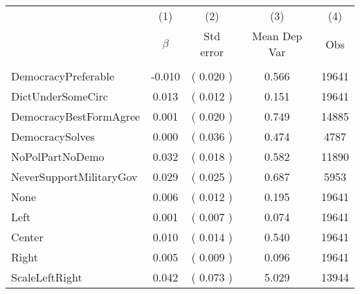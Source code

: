 \begin{tabular}{l c c c c} \toprule\toprule
& (1) & (2) & (3) & (4) \\
& $\beta$ & Std error & Mean Dep Var & Obs \\ \cmidrule(lr){2-2}\cmidrule(lr){3-3}\cmidrule(lr){4-4}\cmidrule(lr){5-5}&\\
DemocracyPreferable &    -0.010 & (    0.020 ) &     0.566 &     19641  \\
DictUnderSomeCirc &     0.013 & (    0.012 ) &     0.151 &     19641  \\
DemocracyBestFormAgree &     0.001 & (    0.020 ) &     0.749 &     14885  \\
DemocracySolves &     0.000 & (    0.036 ) &     0.474 &      4787  \\
NoPolPartNoDemo &     0.032 & (    0.018 ) &     0.582 &     11890  \\
NeverSupportMilitaryGov &     0.029 & (    0.025 ) &     0.687 &      5953  \\
None &     0.006 & (    0.012 ) &     0.195 &     19641  \\
Left &     0.001 & (    0.007 ) &     0.074 &     19641  \\
Center &     0.010 & (    0.014 ) &     0.540 &     19641  \\
Right &     0.005 & (    0.009 ) &     0.096 &     19641  \\
ScaleLeftRight &     0.042 & (    0.073 ) &     5.029 &     13944  \\
\toprule\toprule
\end{tabular} 
